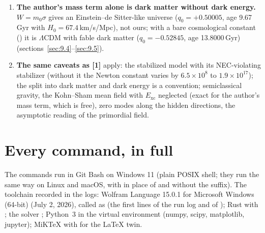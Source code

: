 \begin{enumerate}
        ( $\nu=0.236$, 30\,eV), $[-0.611,\,+3.59\times10^{-6}]$ (100\,eV), $[-27.6,\,+0.333]$ and
        $[-27.7,\,+0.333]$ ( $\nu=0.5$), $[-21.8,\,+0.333]$ (), $[-47.1,\,+0.333]$
        (), and $[-0.364,\,-3.89\times10^{-5}]$ (Part~VIII's case) (). This late
        variation is the same exchange that makes the inferred dark energy vary in [1], and it carries all of
        [1]'s caveats (adiabatic instability, the sea energy, the viability window $\nu<0.2788$).
  \item \textbf{The author's mass term alone is dark matter without dark energy.} $W=m_0\sigma$ gives an
        Einstein--de Sitter-like universe ($q_0=+0.50005$, age 9.67\,Gyr with $H_0=67.4$\,km/s/Mpc), not ours;
        with a bare cosmological constant () it is $\Lambda$CDM with fable dark matter
        ($q_0=-0.52845$, age 13.8000\,Gyr) (sections~\ref{sec:9.4}--\ref{sec:9.5}).
  \item \textbf{The same caveats as [1]} apply: the stabilized model with its NEC-violating stabilizer (without
        it the Newton constant varies by $6.5\times10^{8}$ to $1.9\times10^{17}$); the split into dark matter and
        dark energy is a convention; semiclassical gravity, the Kohn--Sham mean field with $E_{\mathrm{xc}}$
        neglected (exact for the author's mass term, which is free), zero modes along the hidden directions,
        the asymptotic reading of the primordial field.
\end{enumerate}

\section{Every command, in full}
\label{sec:11}

The commands run in Git Bash on Windows 11 (plain POSIX shell; they run the same way on Linux and macOS, with
 in place of  and without the  suffix). The
toolchain recorded in the logs: Wolfram Language 15.0.1 for Microsoft Windows (64-bit) (July 2, 2026), called as
 (the first lines of the run log and of ); Rust with
; the solver ; Python~3 in the
virtual environment  (numpy, scipy, matplotlib, jupyter); MiKTeX with
 for the LaTeX twin.

